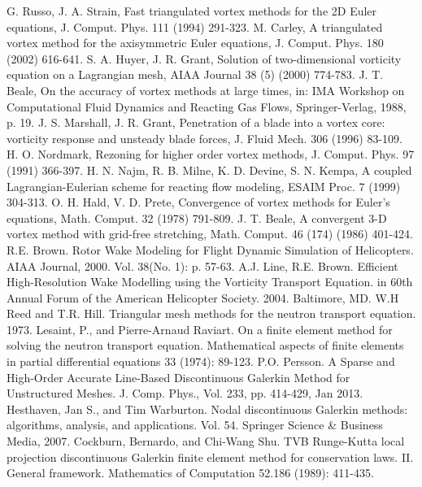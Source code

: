\documentclass[letterpaper,12pt]{report}
\begin{document}
\begin{thebibliography}{9}
G. Russo, J. A. Strain, Fast triangulated vortex methods for the 2D Euler equations, J. Comput. Phys. 111 (1994) 291-323.
M. Carley, A triangulated vortex method for the axisymmetric Euler equations, J. Comput. Phys. 180 (2002) 616-641.
S. A. Huyer, J. R. Grant, Solution of two-dimensional vorticity equation on a Lagrangian mesh, AIAA Journal 38 (5) (2000) 774-783.
J. T. Beale, On the accuracy of vortex methods at large times, in: IMA Workshop on Computational Fluid Dynamics and Reacting Gas Flows, Springer-Verlag, 1988, p. 19.
J. S. Marshall, J. R. Grant, Penetration of a blade into a vortex core: vorticity response and unsteady blade forces, J. Fluid Mech. 306 (1996) 83-109.
H. O. Nordmark, Rezoning for higher order vortex methods, J. Comput. Phys. 97 (1991) 366-397.
H. N. Najm, R. B. Milne, K. D. Devine, S. N. Kempa, A coupled Lagrangian-Eulerian scheme for reacting flow modeling, ESAIM Proc. 7 (1999) 304-313.
O. H. Hald, V. D. Prete, Convergence of vortex methods for Euler's equations, Math. Comput. 32 (1978) 791-809.
J. T. Beale, A convergent 3-D vortex method with grid-free stretching, Math. Comput. 46 (174) (1986) 401-424.
 R.E. Brown. Rotor Wake Modeling for Flight Dynamic Simulation of Helicopters. AIAA Journal, 2000. Vol. 38(No. 1): p. 57-63.
A.J. Line, R.E. Brown. Efficient High-Resolution Wake Modelling using the Vorticity Transport Equation. in 60th Annual Forum of the American Helicopter Society. 2004. Baltimore, MD.
W.H Reed and T.R. Hill. Triangular mesh methods for the neutron transport equation. 1973.
Lesaint, P., and Pierre-Arnaud Raviart. On a finite element method for solving the neutron transport equation. Mathematical aspects of finite elements in partial differential equations 33 (1974): 89-123.
P.O. Persson. A Sparse and High-Order Accurate Line-Based Discontinuous Galerkin Method for Unstructured Meshes. J. Comp. Phys., Vol. 233, pp. 414-429, Jan 2013.
Hesthaven, Jan S., and Tim Warburton. Nodal discontinuous Galerkin methods: algorithms, analysis, and applications. Vol. 54. Springer Science \& Business Media, 2007.
Cockburn, Bernardo, and Chi-Wang Shu. TVB Runge-Kutta local projection discontinuous Galerkin finite element method for conservation laws. II. General framework. Mathematics of Computation 52.186 (1989): 411-435.

\end{thebibliography}
\end{document}

